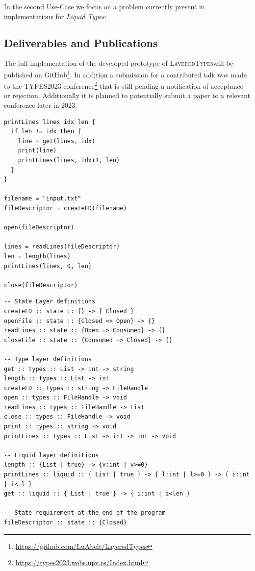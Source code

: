 \documentclass{easychair}
\newcommand{\LayeredTypes}{\textsc{LayeredTypes}}
\begin{document}
In the second Use-Case we focus on a problem currently present in implementations for \textit{Liquid Types}:

\subsection{Deliverables and Publications}

The full implementation of the developed prototype of \LayeredTypes will be published on GitHub\footnote{\url{https://github.com/LuAbelt/LayeredTypes}}. In addition a submission for a contributed talk was made to the TYPES2023 conference\footnote{\url{https://types2023.webs.upv.es/Index.html}} that is still pending a notification of acceptance or rejection. Additionally it is planned to potentially submit a paper to a relevant conference later in 2023.





\begin{minipage}{0.4\linewidth}
\begin{lstlisting}[caption={Simple example code},label={lst:code_before}]
printLines lines idx len {
  if len != idx then {
    line = get(lines, idx)
    print(line)
    printLines(lines, idx+1, len)
  }
}

filename = "input.txt"
fileDescriptor = createFD(filename)

open(fileDescriptor)

lines = readLines(fileDescriptor)
len = length(lines)
printLines(lines, 0, len)

close(fileDescriptor)
\end{lstlisting}
\end{minipage}%
\begin{minipage}{0.59\linewidth}
\begin{lstlisting}[caption={Annotations for \LayeredTypes},label={lst:code_after}]
-- State Layer definitions
createFD :: state :: {} -> { Closed }
openFile :: state :: {Closed => Open} -> {}
readLines :: state :: {Open => Consumed} -> {}
closeFile :: state :: {Consumed => Closed} -> {}

-- Type layer definitions
get :: types :: List -> int -> string
length :: types :: List -> int
createFD :: types :: string -> FileHandle
open :: types :: FileHandle -> void
readLines :: types :: FileHandle -> List
close :: types :: FileHandle -> void
print :: types :: string -> void
printLines :: types :: List -> int -> int -> void

-- Liquid layer definitions
length :: {List | true} -> {v:int | v>=0}
printLines :: liquid :: { List | true } -> { l:int | l>=0 } -> { i:int | i<=l }
get :: liquid :: { List | true } -> { i:int | i<len }

-- State requirement at the end of the program
fileDescriptor :: state :: {Closed}	
\end{lstlisting}
\end{minipage}
\end{document}
